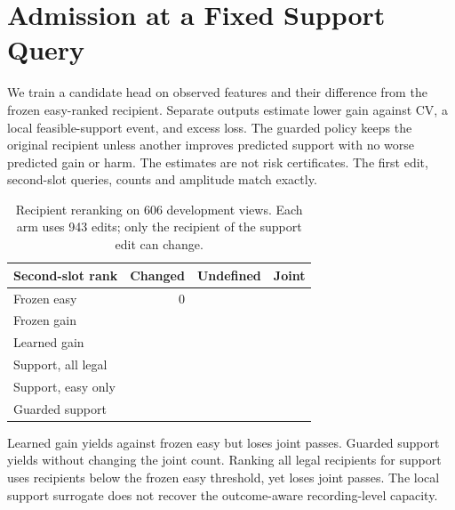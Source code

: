 \section{Admission at a Fixed Support Query}

We train a candidate head on observed features and their difference
from the frozen easy-ranked recipient. Separate outputs estimate lower
gain against CV, a local feasible-support event, and excess loss.
The guarded policy keeps the original recipient unless another
improves predicted support with no worse predicted gain or harm.
The estimates are not risk certificates. The first edit, second-slot
queries, counts and amplitude match exactly.

\begin{table}[h]
\centering
\caption{Recipient reranking on 606 development views. Each arm
uses 943 edits; only the recipient of the support edit can change.}
\small
\begin{tabular}{lrrr}
\toprule
Second-slot rank & Changed & Undefined & Joint \\
\midrule
Frozen easy & 0 & \AdmitEasyUndefined{} & \AdmitEasyJoint{} \\
Frozen gain & \AdmitMatchChanged{} & \AdmitMatchUndefined{} & \AdmitMatchJoint{} \\
Learned gain & \AdmitGainChanged{} & \AdmitGainUndefined{} & \AdmitGainJoint{} \\
Support, all legal & \AdmitWideChanged{} & \AdmitWideUndefined{} & \AdmitWideJoint{} \\
Support, easy only & \AdmitNarrowChanged{} & \AdmitNarrowUndefined{} & \AdmitNarrowJoint{} \\
Guarded support & \AdmitGuardChanged{} & \AdmitGuardUndefined{} & \AdmitGuardJoint{} \\
\bottomrule
\end{tabular}
\end{table}

Learned gain yields \AdmitGainEffect{} against frozen easy but
loses joint passes. Guarded support yields \AdmitGuardEffect{}
without changing the joint count. Ranking all legal recipients
for support uses \AdmitWideOutside{} recipients below the frozen
easy threshold, yet loses joint passes. The local support surrogate
does not recover the outcome-aware recording-level capacity.
